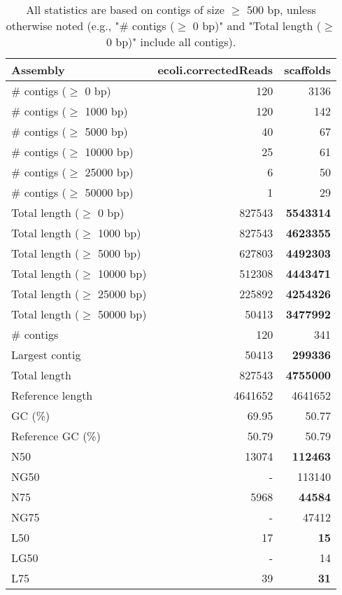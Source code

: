 \documentclass[12pt,a4paper]{article}
\begin{document}
\begin{table}[ht]
\begin{center}
\caption{All statistics are based on contigs of size $\geq$ 500 bp, unless otherwise noted (e.g., "\# contigs ($\geq$ 0 bp)" and "Total length ($\geq$ 0 bp)" include all contigs).}
\begin{tabular}{|l*{2}{|r}|}
\hline
Assembly & ecoli.correctedReads & scaffolds \\ \hline
\# contigs ($\geq$ 0 bp) & 120 & 3136 \\ \hline
\# contigs ($\geq$ 1000 bp) & 120 & 142 \\ \hline
\# contigs ($\geq$ 5000 bp) & 40 & 67 \\ \hline
\# contigs ($\geq$ 10000 bp) & 25 & 61 \\ \hline
\# contigs ($\geq$ 25000 bp) & 6 & 50 \\ \hline
\# contigs ($\geq$ 50000 bp) & 1 & 29 \\ \hline
Total length ($\geq$ 0 bp) & 827543 & {\bf 5543314} \\ \hline
Total length ($\geq$ 1000 bp) & 827543 & {\bf 4623355} \\ \hline
Total length ($\geq$ 5000 bp) & 627803 & {\bf 4492303} \\ \hline
Total length ($\geq$ 10000 bp) & 512308 & {\bf 4443471} \\ \hline
Total length ($\geq$ 25000 bp) & 225892 & {\bf 4254326} \\ \hline
Total length ($\geq$ 50000 bp) & 50413 & {\bf 3477992} \\ \hline
\# contigs & 120 & 341 \\ \hline
Largest contig & 50413 & {\bf 299336} \\ \hline
Total length & 827543 & {\bf 4755000} \\ \hline
Reference length & 4641652 & 4641652 \\ \hline
GC (\%) & 69.95 & 50.77 \\ \hline
Reference GC (\%) & 50.79 & 50.79 \\ \hline
N50 & 13074 & {\bf 112463} \\ \hline
NG50 & - & 113140 \\ \hline
N75 & 5968 & {\bf 44584} \\ \hline
NG75 & - & 47412 \\ \hline
L50 & 17 & {\bf 15} \\ \hline
LG50 & - & 14 \\ \hline
L75 & 39 & {\bf 31} \\ \hline

\end{tabular}
\end{center}
\end{table}
\end{document}
